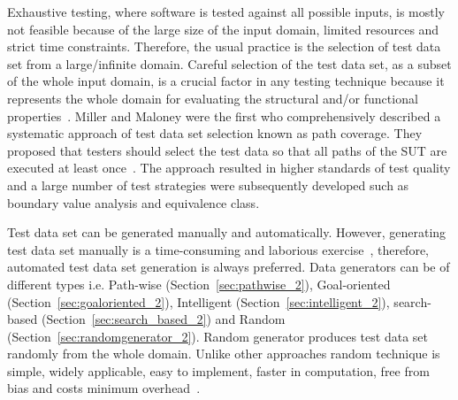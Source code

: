 Exhaustive testing, where software is tested against all possible inputs, is mostly not feasible because of the large size of the input domain, limited resources and strict time constraints. Therefore, the usual practice is the selection of test data set from a large/infinite domain. Careful selection of the test data set, as a subset of the whole input domain, is a crucial factor in any testing technique because it represents the whole domain for evaluating the structural and/or functional properties~\cite{howden1986functional, mccabe1983structured}. Miller and Maloney were the first who comprehensively described a systematic approach of test data set selection known as path coverage. They proposed that testers should select the test data so that all paths of the SUT are executed at least once~\cite{miller1963systematic}. The approach resulted in higher standards of test quality and a large number of test strategies were subsequently developed such as boundary value analysis and equivalence class. 

Test data set can be generated manually and automatically. However, generating test data set manually is a time-consuming and laborious exercise~\cite{korel1990automated}, therefore, automated test data set generation is always preferred. Data generators can be of different types i.e. Path-wise (Section~\ref{sec:pathwise_2}), Goal-oriented (Section~\ref{sec:goaloriented_2}), Intelligent (Section~\ref{sec:intelligent_2}), search-based (Section~\ref{sec:search_based_2}) and Random (Section~\ref{sec:randomgenerator_2}). Random generator produces test data set randomly from the whole domain. Unlike other approaches random technique is simple, widely applicable, easy to implement, faster in computation, free from bias and costs minimum overhead~\cite{ciupa2007experimental}. 


